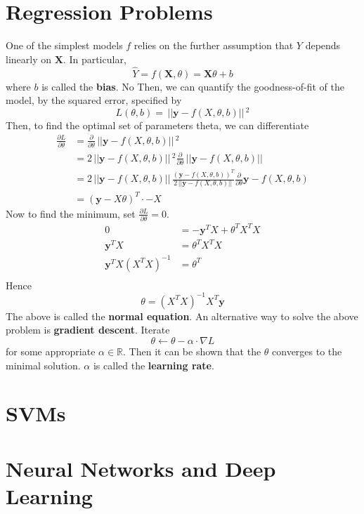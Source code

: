 \documentclass{article}
\renewcommand{\vec}[1]{\mathbf{#1}}
\newcommand{\norm}[1]{\,||#1||\,}
\newcommand{\diff}[2]{\frac{\partial #1}{\partial #2}}
\newcommand{\Reals}{\mathbb{R}}
\begin{document}
\section{Regression Problems}
One of the simplest models $f$ relies on the further assumption that $Y$ depends
linearly on $\vec{X}$. In particular,
\[
  \hat{Y} = f(\vec{X}, \theta) = \vec{X}\theta + b
\]
where $b$ is called the \textbf{bias}. No
Then, we can quantify the goodness-of-fit of the model, by the squared
error, specified by
\[
  L(\theta, b) = \norm{\vec{y} - f(X, \theta, b)}^2 
\]
Then, to find the optimal set of parameters theta, we can differentiate 
\begin{align*}
  \diff{L}{\theta} &= \diff{}{\theta}{\norm{\vec{y} - f(X, \theta, b)}^2 } \\
                   &= 2 \norm{\vec{y} - f(X, \theta, b)}^2 \diff{}{\theta}\norm{\vec{y} - f(X, \theta, b)}  \\
                   &= 2 \norm{\vec{y} - f(X, \theta, b)} \frac{(\vec{y} - f(X, \theta, b))^T}{2\norm{\vec{y} - f(X, \theta, b)}}\diff{}{\theta}\vec{y} - f(X, \theta, b)  \\
                   &= (\vec{y} - X\theta)^T \cdot -X
\end{align*}
Now to find the minimum, set $\diff{L}{\theta} = 0$.
\begin{align*}
  0 &= -\vec{y}^TX + \theta^TX^TX \\
  \vec{y}^TX &= \theta^TX^TX \\
  \vec{y}^TX(X^TX)^{-1} &= \theta^T \\
\end{align*}
Hence
\[
  \theta = (X^TX)^{-1}X^T\vec{y}
\]
The above is called the \textbf{normal equation}.
An alternative way to solve the above problem is \textbf{gradient descent}.
Iterate
\[
  \theta \leftarrow \theta - \alpha \cdot \nabla L
\]
for some appropriate $\alpha \in \Reals$. Then it can be shown that the $\theta$ converges
to the minimal solution. $\alpha$ is called the \textbf{learning rate}.
\section{SVMs}

\section{Neural Networks and Deep Learning}
\end{document}
